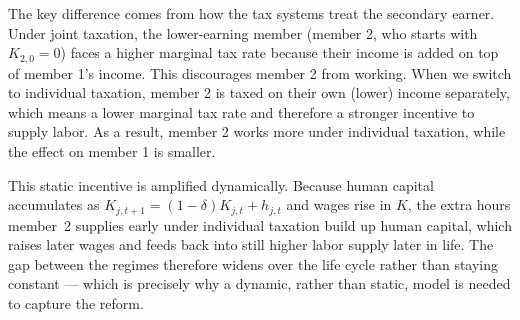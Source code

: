 The key difference comes from how the tax systems treat the secondary earner. Under joint taxation, the lower-earning member (member 2, who starts with $K_{2,0}=0$) faces a higher marginal tax rate because their income is added on top of member 1's income. This discourages member 2 from working. When we switch to individual taxation, member 2 is taxed on their own (lower) income separately, which means a lower marginal tax rate and therefore a stronger incentive to supply labor. As a result, member 2 works more under individual taxation, while the effect on member 1 is smaller.

This static incentive is amplified dynamically. Because human capital accumulates as $K_{j,t+1} = (1-\delta)K_{j,t} + h_{j,t}$ and wages rise in $K$, the extra hours member~2 supplies early under individual taxation build up human capital, which raises later wages and feeds back into still higher labor supply later in life. The gap between the regimes therefore widens over the life cycle rather than staying constant --- which is precisely why a dynamic, rather than static, model is needed to capture the reform.
